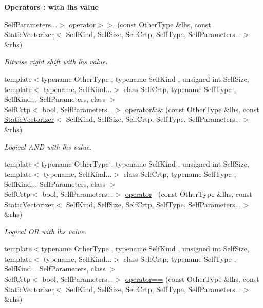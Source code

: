 \begin{Indent}{\bf Operators \-: with lhs value}
\begin{DoxyCompactItemize}
Self\-Parameters...$>$ \hyperlink{classmagrathea_1_1StaticVectorizer_a4ea24bc9e8e6d2db161ea115bc587446}{operator$>$$>$} (const Other\-Type \&lhs, const \hyperlink{classmagrathea_1_1StaticVectorizer}{Static\-Vectorizer}$<$ Self\-Kind, Self\-Size, Self\-Crtp, Self\-Type, Self\-Parameters...$>$ \&rhs)
\begin{DoxyCompactList}\small\item\em Bitwise right shift with lhs value. \end{DoxyCompactList}\item 
{\footnotesize template$<$typename Other\-Type , typename Self\-Kind , unsigned int Self\-Size, template$<$ typename, Self\-Kind...$>$ class Self\-Crtp, typename Self\-Type , Self\-Kind... Self\-Parameters, class $>$ }\\Self\-Crtp$<$ bool, Self\-Parameters...$>$ \hyperlink{classmagrathea_1_1StaticVectorizer_aae2fc75417259acf41fd1d84ffb5469b}{operator\&\&} (const Other\-Type \&lhs, const \hyperlink{classmagrathea_1_1StaticVectorizer}{Static\-Vectorizer}$<$ Self\-Kind, Self\-Size, Self\-Crtp, Self\-Type, Self\-Parameters...$>$ \&rhs)
\begin{DoxyCompactList}\small\item\em Logical A\-N\-D with lhs value. \end{DoxyCompactList}\item 
{\footnotesize template$<$typename Other\-Type , typename Self\-Kind , unsigned int Self\-Size, template$<$ typename, Self\-Kind...$>$ class Self\-Crtp, typename Self\-Type , Self\-Kind... Self\-Parameters, class $>$ }\\Self\-Crtp$<$ bool, Self\-Parameters...$>$ \hyperlink{classmagrathea_1_1StaticVectorizer_a324a2459dcb212c2e79f7bdccebe80d2}{operator$|$$|$} (const Other\-Type \&lhs, const \hyperlink{classmagrathea_1_1StaticVectorizer}{Static\-Vectorizer}$<$ Self\-Kind, Self\-Size, Self\-Crtp, Self\-Type, Self\-Parameters...$>$ \&rhs)
\begin{DoxyCompactList}\small\item\em Logical O\-R with lhs value. \end{DoxyCompactList}\item 
{\footnotesize template$<$typename Other\-Type , typename Self\-Kind , unsigned int Self\-Size, template$<$ typename, Self\-Kind...$>$ class Self\-Crtp, typename Self\-Type , Self\-Kind... Self\-Parameters, class $>$ }\\Self\-Crtp$<$ bool, Self\-Parameters...$>$ \hyperlink{classmagrathea_1_1StaticVectorizer_ae434f3dcb55f00b2c92e63385f9e5b42}{operator==} (const Other\-Type \&lhs, const \hyperlink{classmagrathea_1_1StaticVectorizer}{Static\-Vectorizer}$<$ Self\-Kind, Self\-Size, Self\-Crtp, Self\-Type, Self\-Parameters...$>$ \&rhs)

\end{DoxyCompactItemize}
\end{Indent}
